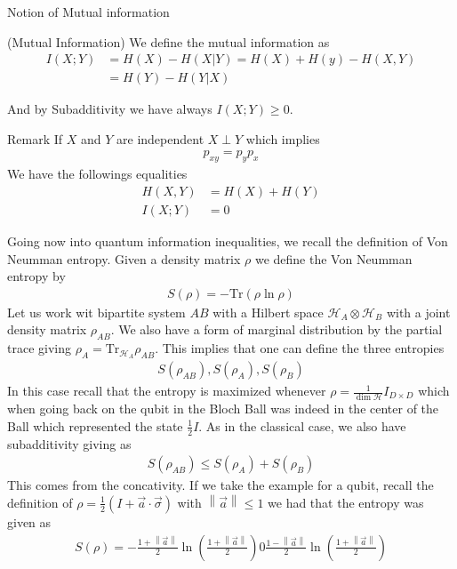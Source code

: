 \begin{parag}{Notion of Mutual information}
	\begin{definition}{(Mutual Information)}
    	We define the mutual information as 
		\begin{align*} 
			I\left(X; Y\right) &= H\left(X\right) - H\left(X|Y\right)= H\left(X\right) + H\left(y\right) - H\left(X, Y\right)\\
			&= H\left(Y\right) - H\left(Y | X\right)
		\end{align*}

    \end{definition}
	And by Subadditivity we have always $I\left(X;Y\right) \geq 0$.
	\begin{subparag}{Remark}
	    If $X$ and $Y$ are independent $X \perp Y$ which implies 
		\begin{align*} 
			p_{xy} = p_yp_x 
		\end{align*}
		We have the followings equalities
		\begin{align*} 
			H\left(X, Y\right) &= H\left(X\right) + H\left(Y\right) \\
			I\left(X;Y\right) &= 0
		\end{align*}
	\end{subparag}
\end{parag}


Going now into quantum information inequalities, we recall the definition of Von Neumman entropy. Given a density matrix $\rho$ we define the Von Neumman entropy by 
\begin{align*} 
	S\left(\rho\right) = - \text{Tr}\left(\rho \ln \rho\right) 
\end{align*}
Let us work wit bipartite system $AB$ with a Hilbert space $\mathcal{H}_A \otimes \mathcal{H}_B$ with a joint density matrix $\rho_{AB}$. We also have a form of marginal distribution by the partial trace giving $\rho_A = \text{Tr}_{\mathcal{H}_A}\rho_{AB}$. This implies that one can define the three entropies 
\begin{align*} 
	S\left(\rho_{AB}\right) , S\left(\rho_A\right), S\left(\rho_B\right)
\end{align*}
In this case recall that the entropy is maximized whenever $\rho =  \frac{1}{\dim \mathcal{H}}I_{D \times D}$ which when going back on the qubit in the Bloch Ball was indeed in the center of the Ball which represented the state $\frac{1}{2}I$. As in the classical case, we also have subadditivity giving as 
\begin{align*} 
	S\left(\rho_{AB}\right) \leq S\left(\rho_A\right) + S\left(\rho_B\right) 
\end{align*}
This comes from the concativity. If we take the example for a qubit, recall the definition of $\rho = \frac{1}{2}\left(I + \vec{a} \cdot  \vec{\sigma}\right)$ with $\left\|\vec{a}\right\| \leq 1$ we had that the entropy was given as 
\begin{align*} 
	S\left(\rho\right) = - \frac{1 + \left\|\vec{a}\right\|}{2}\ln\left(\frac{1 + \left\|\vec{a}\right\|}{2}\right)  0 \frac{1 - \left\|\vec{a}\right\|}{2}\ln\left(\frac{1 + \left\|\vec{a}\right\|}{2}\right)
\end{align*}


